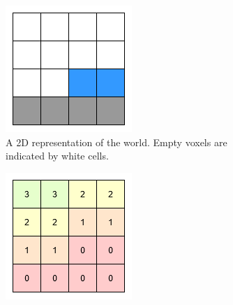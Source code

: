 \begin{figure}[htbp]
  \centering
  \begin{subfigure}{0.49\textwidth}
    \centering
    \includegraphics[width=\textwidth]{figures/voxel_grid.drawio.png}
    \caption{A 2D representation of the world. Empty voxels are indicated by white cells.}
    \label{fig:voxel_grid}
  \end{subfigure}
  \hfill
  \begin{subfigure}{0.49\textwidth}
    \centering
    \includegraphics[width=\textwidth]{figures/voxel_grid_df.drawio.png}

\end{subfigure}
\end{figure}

